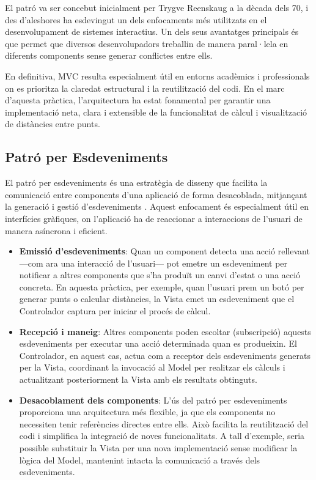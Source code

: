 \documentclass{ieeetj}
\begin{document}
El patró va ser concebut inicialment per Trygve Reenskaug a la dècada dels 70, i des d’aleshores ha esdevingut un dels enfocaments més utilitzats en el desenvolupament de sistemes interactius. Un dels seus avantatges principals és que permet que diversos desenvolupadors treballin de manera paral·lela en diferents components sense generar conflictes entre ells.

En definitiva, MVC resulta especialment útil en entorns acadèmics i professionals on es prioritza la claredat estructural i la reutilització del codi. En el marc d’aquesta pràctica, l’arquitectura ha estat fonamental per garantir una implementació neta, clara i extensible de la funcionalitat de càlcul i visualització de distàncies entre punts.

\subsection{Patró per Esdeveniments}
El patró per esdeveniments és una estratègia de disseny que facilita la comunicació entre components d'una aplicació de forma desacoblada, mitjançant la generació i gestió d'esdeveniments \cite{Patró per Esdeveniments}. Aquest enfocament és especialment útil en interfícies gràfiques, on l'aplicació ha de reaccionar a interaccions de l’usuari de manera asíncrona i eficient.

\begin{itemize}
    \item \textbf{Emissió d’esdeveniments}: Quan un component detecta una acció rellevant —com ara una interacció de l’usuari— pot emetre un esdeveniment per notificar a altres components que s’ha produït un canvi d’estat o una acció concreta. En aquesta pràctica, per exemple, quan l’usuari prem un botó per generar punts o calcular distàncies, la Vista emet un esdeveniment que el Controlador captura per iniciar el procés de càlcul.
    
    \item \textbf{Recepció i maneig}: Altres components poden escoltar (subscripció) aquests esdeveniments per executar una acció determinada quan es produeixin. El Controlador, en aquest cas, actua com a receptor dels esdeveniments generats per la Vista, coordinant la invocació al Model per realitzar els càlculs i actualitzant posteriorment la Vista amb els resultats obtinguts.
    
    \item \textbf{Desacoblament dels components}: L’ús del patró per esdeveniments proporciona una arquitectura més flexible, ja que els components no necessiten tenir referències directes entre ells. Això facilita la reutilització del codi i simplifica la integració de noves funcionalitats. A tall d’exemple, seria possible substituir la Vista per una nova implementació sense modificar la lògica del Model, mantenint intacta la comunicació a través dels esdeveniments.
\end{itemize}
\end{document}

